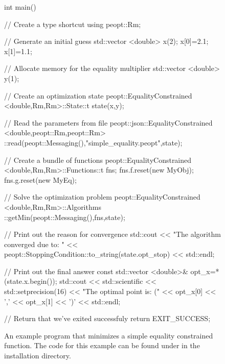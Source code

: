 \begin{figure}
    \ContinuedFloat
    \begin{lstCpp}
int main(){
    // Create a type shortcut
    using peopt::Rm;

    // Generate an initial guess
    std::vector <double> x(2);
    x[0]=2.1; x[1]=1.1;

    // Allocate memory for the equality multiplier
    std::vector <double> y(1);
    
    // Create an optimization state
    peopt::EqualityConstrained <double,Rm,Rm>::State::t state(x,y);
    
    // Read the parameters from file 
    peopt::json::EqualityConstrained <double,peopt::Rm,peopt::Rm>
        ::read(peopt::Messaging(),"simple_equality.peopt",state);
    
    // Create a bundle of functions
    peopt::EqualityConstrained <double,Rm,Rm>::Functions::t fns;
    fns.f.reset(new MyObj);
    fns.g.reset(new MyEq);
    
    // Solve the optimization problem
    peopt::EqualityConstrained <double,Rm,Rm>::Algorithms
        ::getMin(peopt::Messaging(),fns,state);
    
    // Print out the reason for convergence
    std::cout << "The algorithm converged due to: " <<
        peopt::StoppingCondition::to_string(state.opt_stop) <<
        std::endl;
    
    // Print out the final answer
    const std::vector <double>& opt_x=*(state.x.begin());
    std::cout << std::scientific << std::setprecision(16)
        << "The optimal point is: (" << opt_x[0] << ','
        << opt_x[1] << ')' << std::endl;
    
    // Return that we've exited successfuly
    return EXIT_SUCCESS;
}
\end{lstCpp}
    \caption{An example program that minimizes a simple equality constrained function.  The code for this example can be found under \protect{} in the installation directory.}
    \label{fig:simpleEq}
\end{figure}
